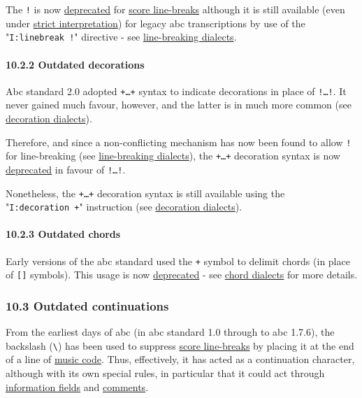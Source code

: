 \documentclass[oneside]{book}
\let\oldparagraph\paragraph
\renewcommand{\paragraph}[1]{\oldparagraph{#1}\mbox{}}
\begin{document}
The \texttt{!} is now \protect\hyperlink{outdated_syntax}{deprecated}
for \protect\hyperlink{score_line-break_definition}{score line-breaks}
although it is still available (even under
\protect\hyperlink{strict_interpretation}{strict interpretation}) for
legacy abc transcriptions by use of the "\texttt{I:linebreak\ !}"
directive - see \protect\hyperlink{line-breaking_dialects}{line-breaking
dialects}.

\hypertarget{outdated_decorations}{\paragraph{10.2.2 Outdated
decorations}\label{outdated_decorations}}

Abc standard 2.0 adopted \texttt{+\ldots{}+} syntax to indicate
decorations in place of \texttt{!\ldots{}!}. It never gained much
favour, however, and the latter is in much more common (see
\protect\hyperlink{decoration_dialects}{decoration dialects}).

Therefore, and since a non-conflicting mechanism has now been found to
allow \texttt{!} for line-breaking (see
\protect\hyperlink{line-breaking_dialects}{line-breaking dialects}), the
\texttt{+\ldots{}+} decoration syntax is now
\protect\hyperlink{outdated_syntax}{deprecated} in favour of
\texttt{!\ldots{}!}.

Nonetheless, the \texttt{+\ldots{}+} decoration syntax is still
available using the "\texttt{I:decoration\ +}" instruction (see
\protect\hyperlink{decoration_dialects}{decoration dialects}).

\hypertarget{outdated_chords}{\paragraph{10.2.3 Outdated
chords}\label{outdated_chords}}

Early versions of the abc standard used the \texttt{+} symbol to delimit
chords (in place of \texttt{{[}{]}} symbols). This usage is now
\protect\hyperlink{outdated_syntax}{deprecated} - see
\protect\hyperlink{chord_dialects}{chord dialects} for more details.

\hypertarget{outdated_continuations}{\subsubsection{10.3 Outdated
continuations}\label{outdated_continuations}}

From the earliest days of abc (in abc standard 1.0 through to abc
1.7.6), the backslash (\texttt{\textbackslash{}}) has been used to
suppress \protect\hyperlink{score_line-break_definition}{score
line-breaks} by placing it at the end of a line of
\protect\hyperlink{music_code_definition}{music code}. Thus,
effectively, it has acted as a continuation character, although with its
own special rules, in particular that it could act through
\protect\hyperlink{information_field_definition}{information fields} and
\protect\hyperlink{comment_definition}{comments}.
\end{document}
